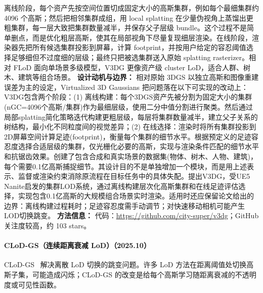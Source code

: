 离线阶段，每个资产先按空间位置切成固定大小的高斯集群，例如每个最细集群约 4096 个高斯；然后把相邻集群成组，用 local splatting 在少量伪视角上蒸馏出更粗集群，每一层大致把集群数量减半，并保存父子层级 bundle。这个过程不是简单删点，而是优化粗层高斯，使其在局部视角下尽量复现细层渲染。在线阶段，渲染器先把所有候选集群投影到屏幕，计算 footprint，并按用户给定的容忍阈值选择足够细但不过度细的层级；最终只把被选集群送入原始 splatting rasterizer。相对 FLoD 面向单场景多级模型，V3DG 更像资产级 cluster LoD，适合人群、树木、建筑等组合场景。
\textbf{设计动机与边界：} 相对原始 3DGS 以独立高斯和图像重建误差为主的设定，Virtualized 3D Gaussians 把问题落在以下可实现的改动上：V3DG包含两个阶段：(1) 离线构建：每个3DGS资产先被分割为固定大小的集群(nGC=4096个高斯/集群)作为最细层级，使用二分中值分割进行聚类。然后通过局部splatting简化策略迭代构建更粗层级，每层将集群数量减半，建立父子关系的树结构，最小化不同粒度间的视觉差异；(2) 在线选择：渲染时将所有集群投影到2D屏幕空间计算足迹(footprint)，衡量每个集群的细节水平。根据预定义的足迹容忍度选择合适层级的集群，仅光栅化必要的高斯，实现与渲染条件匹配的细节水平和抗锯齿效果。创建了包含合成和真实场景的数据集(物体、树木、人物、建筑)，每个需要0.1亿高斯捕捉细节。其设计目的不是单独增加一个模块，而是用上述表示、监督或渲染约束消除原流程在目标任务中的具体失配。提出V3DG，受UE5 Nanite启发的集群LOD系统，通过离线构建层次化高斯集群和在线足迹评估选择，实现包含0.1亿高斯的大规模组合场景实时渲染。适用时还应保留论文给出的边界：离线构建过程耗时；足迹容忍度需手动调节；对快速移动相机可能产生LOD切换跳变。
\textbf{方法信息：} 代码：\url{https://github.com/city-super/v3dg}；GitHub 关注度较高，约 103 stars。



\paragraph{CLoD-GS（连续距离衰减 LoD）（2025.10）}
CLoD-GS~\cite{2510_09997} 解决离散 LoD 切换的跳变问题。许多 LoD 方法在距离阈值处切换高斯子集，可能造成闪烁；CLoD-GS 的改变是给每个高斯学习随距离衰减的不透明度或可见性函数。

